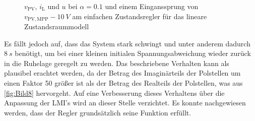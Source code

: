 \begin{figure}[H]
    \centering
    \caption[Validierung Regler mit einfacher Rückführung (linear)]{$v_{\mathrm{PV}}$, $i_{\mathrm{L}}$ und $u$ bei $\alpha = 0.1$ und einem Einganssprung von $v_{\mathrm{PV,MPP}} - \SI{10}{V}$ am einfachen Zustandsregler für das lineare Zustandsraummodell}
    \label{fig:Bild14}
\end{figure}

Es fällt jedoch auf, dass das System stark schwingt und unter anderem dadurch \ca $\SI{8}{s}$ benötigt, um bei einer kleinen initialen Spannungsabweichung wieder zurück in die Ruhelage geregelt zu werden. Das beschriebene Verhalten kann als plausibel erachtet werden, da der Betrag des Imaginärteils der Polstellen um einen Faktor 50 größer ist als der Betrag des Realteils der Polstellen, was aus \autoref{fig:Bild8} hervorgeht. Auf eine Verbesserung dieses Verhaltens über die Anpassung der LMI's wird an dieser Stelle verzichtet. Es konnte nachgewiesen werden, dass der Regler grundsätzlich seine Funktion erfüllt.


